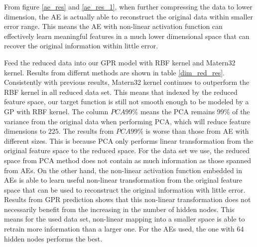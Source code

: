 \documentclass[11pt,a4paper]{article}
\theoremstyle{definition}
\numberwithin{equation}{section}
\begin{document}
	From figure \ref{ae_res} and \ref{ae_res_1}, when further compressing the data to lower dimension, the AE is actually able to reconstruct the original data within smaller error range. This means the AE with non-linear activation function can effectively learn meaningful features in a much lower dimensional space that can recover the original information within little error. 
	
	Feed the reduced data into our GPR model with RBF kernel and Matern32 kernel. Results from differnt methods are shown in table \ref{dim_red_res}. Consistently with previous results, Matern32 kernel continues to outperform the RBF kernel in all reduced data set. This means that indexed by the reduced feature space, our target function is still not smooth enough to be modeled by a GP with RBF kernel. The column $PCA99\%$ means the PCA remains $99\%$ of the variance from the original data when performing PCA, which will reduce feature dimensions to $225$. The results from $PCA99\%$ is worse than those from AE with different sizes. This is because PCA only performs linear transformation from the original feature space to the reduced space. For the data set we use, the reduced space from PCA method does not contain as much information as those spanned from AEs. On the other hand, the non-linear activation function embedded in AEs is able to learn useful non-linear transformation from the original feature space that can be used to reconstruct the original information with little error. Results from GPR prediction shows that this non-linear transformation does not necessarily benefit from the increasing in the number of hidden nodes. This means for the used data set, non-linear mapping into a smaller space is able to retrain more information than a larger one. For the AEs used, the one with 64 hidden nodes performs the best.
	 
\end{document}
